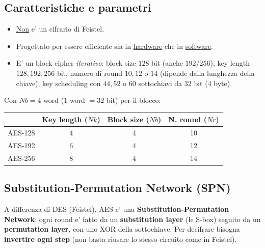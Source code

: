 \subsection{Caratteristiche e parametri}
\begin{itemize}
  \item \underline{Non} e' un cifrario di Feistel.
  \item Progettato per essere efficiente sia in \underline{hardware} che in \underline{software}.
  \item E' un block cipher \textit{iterativo}: block size $ 128 $ bit (anche $ 192/256 $), key length $ 128, 192, 256 $ bit, numero di round $ 10, 12 $ o $ 14 $ (dipende dalla lunghezza della chiave), key scheduling con $ 44, 52 $ o $ 60 $ sottochiavi da $ 32 $ bit ($ 4 $ byte).
\end{itemize}
Con $ Nb = 4 $ word ($ 1 $ word $ = 32 $ bit) per il blocco:
\begin{center}
  \begin{tabular}{|l|c|c|c|}
    \hline
    & \textbf{Key length ($Nk$)} & \textbf{Block size ($Nb$)} & \textbf{N. round ($Nr$)} \\ \hline
    AES-128 & 4 & 4 & 10 \\ \hline
    AES-192 & 6 & 4 & 12 \\ \hline
    AES-256 & 8 & 4 & 14 \\ \hline
  \end{tabular}
\end{center}

\subsection{Substitution-Permutation Network (SPN)}
A differenza di DES (Feistel), AES e' una \textbf{Substitution-Permutation Network}: ogni round e' fatto da un \textbf{substitution layer} (le S-box) seguito da un \textbf{permutation layer}, con uno XOR della sottochiave. Per decifrare bisogna \textbf{invertire ogni step} (non basta riusare lo stesso circuito come in Feistel).

